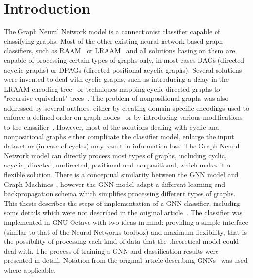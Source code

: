 
\chapter{Introduction}
The Graph Neural Network model is a connectionist classifier capable of classifying graphs. Most of the other existing neural network-based graph classifiers, such as RAAM~\cite{pollack1990recursive} or  LRAAM~\cite{sperduti1994labelling} and all solutions basing on them are capable of processing certain types of graphs only, in most cases DAGs (directed acyclic graphs) or DPAGs (directed positional acyclic graphs).
Several solutions were invented to deal with cyclic graphs, such as introducing a delay in the LRAAM encoding tree~\cite{goulon2005hopfield} or techniques mapping cyclic directed graphs to "recursive equivalent" trees~\cite{bianchini2003backpropagation}.
The problem of nonpositional graphs was also addressed by several authors, either by creating domain-specific encodings used to enforce a defined order on graph nodes~\cite{ivanciuc2003canonical} or by introducing various modifications to the classifier~\cite{bianchini2005recursive}.
However, most of the solutions dealing with cyclic and nonpositional graphs either complicate the classifier model, enlarge the input dataset or (in case of cycles) may result in information loss. The Graph Neural Network model can directly process most types of graphs, including cyclic, acyclic, directed, undirected, positional and nonpositional, which makes it a flexible solution.
There is a conceptual similarity between the GNN model and Graph Machines~\cite{goulon2005learning}, however the GNN model adapt a different learning and backpropagation schema which simplifies processing different types of graphs.
This thesis describes the steps of implementation of a GNN classifier, including some details which were not described in the original article~\cite{scarselli2009graph}. The classifier was implemented in GNU Octave with two ideas in mind: providing a simple interface (similar to that of the Neural Networks toolbox) and maximum flexibility, that is the possibility of processing each kind of data that the theoretical model could deal with. The process of training a GNN and classification results were presented in detail. Notation from the original article describing GNNs~\cite{scarselli2009graph} was used where applicable.

